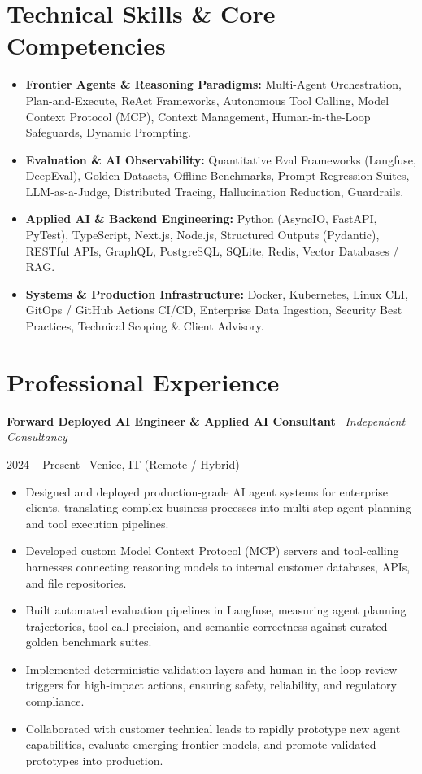 \documentclass[a4paper,10pt]{article}
\newcommand{\role}[4]{%
  \vspace{2pt}\noindent
  \begin{minipage}[t]{0.70\textwidth}\raggedright\textbf{#1} \textbullet\ \textit{#3}\end{minipage}%
  \hfill
  \begin{minipage}[t]{0.28\textwidth}\raggedleft\footnotesize\color{gray}#2 \textbullet\ #4\end{minipage}%
  \vspace{1pt}%
}
\begin{document}
\section{Technical Skills \& Core Competencies}
\begin{itemize}[leftmargin=1.2em, itemsep=2pt]
  \item \textbf{Frontier Agents \& Reasoning Paradigms:} Multi-Agent Orchestration, Plan-and-Execute, ReAct Frameworks, Autonomous Tool Calling, Model Context Protocol (MCP), Context Management, Human-in-the-Loop Safeguards, Dynamic Prompting.
  \item \textbf{Evaluation \& AI Observability:} Quantitative Eval Frameworks (Langfuse, DeepEval), Golden Datasets, Offline Benchmarks, Prompt Regression Suites, LLM-as-a-Judge, Distributed Tracing, Hallucination Reduction, Guardrails.
  \item \textbf{Applied AI \& Backend Engineering:} Python (AsyncIO, FastAPI, PyTest), TypeScript, Next.js, Node.js, Structured Outputs (Pydantic), RESTful APIs, GraphQL, PostgreSQL, SQLite, Redis, Vector Databases / RAG.
  \item \textbf{Systems \& Production Infrastructure:} Docker, Kubernetes, Linux CLI, GitOps / GitHub Actions CI/CD, Enterprise Data Ingestion, Security Best Practices, Technical Scoping \& Client Advisory.
\end{itemize}

\section{Professional Experience}

\role{Forward Deployed AI Engineer \& Applied AI Consultant}{2024 -- Present}{Independent Consultancy}{Venice, IT (Remote / Hybrid)}
\begin{itemize}
  \item Designed and deployed production-grade AI agent systems for enterprise clients, translating complex business processes into multi-step agent planning and tool execution pipelines.
  \item Developed custom Model Context Protocol (MCP) servers and tool-calling harnesses connecting reasoning models to internal customer databases, APIs, and file repositories.
  \item Built automated evaluation pipelines in Langfuse, measuring agent planning trajectories, tool call precision, and semantic correctness against curated golden benchmark suites.
  \item Implemented deterministic validation layers and human-in-the-loop review triggers for high-impact actions, ensuring safety, reliability, and regulatory compliance.
  \item Collaborated with customer technical leads to rapidly prototype new agent capabilities, evaluate emerging frontier models, and promote validated prototypes into production.
\end{itemize}
\end{document}

